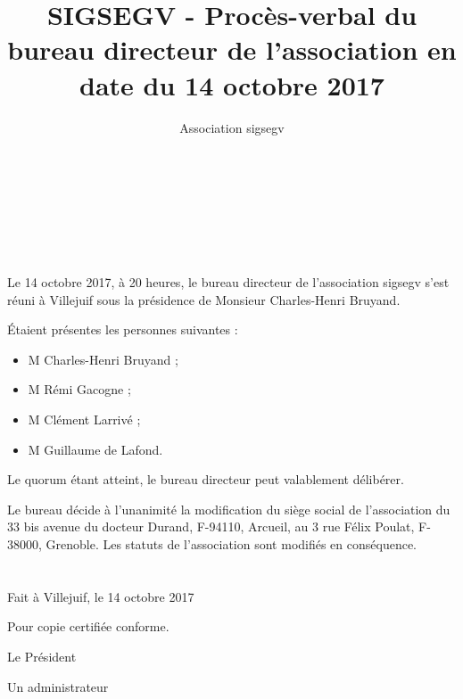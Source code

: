\documentclass[a4paper,oneside,10pt]{article}
\begin{document}

\author{Association sigsegv}
\title{SIGSEGV - Procès-verbal du bureau directeur de l'association en date du 14 octobre 2017}

{ \\
}
\vspace{5mm}
{\centering {\textbf {\Huge -}}\\
}
\vspace{5mm}
{\\
}


\section*{}

Le 14 octobre 2017, à 20 heures, le bureau directeur de l'association sigsegv s'est réuni à Villejuif sous la présidence de Monsieur Charles-Henri Bruyand.

\'Etaient présentes les personnes suivantes :

\begin{itemize}
\item M Charles-Henri Bruyand ;
\item M Rémi Gacogne ;
\item M Clément Larrivé ;
\item M Guillaume de Lafond.
\end{itemize}

Le quorum étant atteint, le bureau directeur peut valablement délibérer.

Le bureau décide à l'unanimité la modification du siège social de l'association du 33 bis avenue du docteur Durand,
F-94110, Arcueil, au 3 rue Félix Poulat, F-38000, Grenoble.
Les statuts de l'association sont modifiés en conséquence.

\section*{}

Fait à Villejuif, le 14 octobre 2017

\bigskip

Pour copie certifiée conforme.

Le Président

Un administrateur
\end{document}
